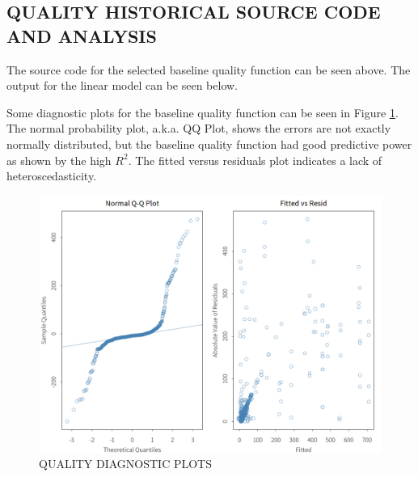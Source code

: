 \documentclass[SDSUThesis.tex]{subfiles}
\begin{document}
    \subsection{QUALITY HISTORICAL SOURCE CODE AND ANALYSIS}
    \label{app:quality-history}
        
        The source code for the selected baseline quality function
        can be seen above. The output for the linear model can be seen below.
        
        
        Some diagnostic plots for the baseline quality function
        can be seen in Figure \ref{fig:quality-diag}.  The normal probability plot,
        a.k.a. QQ Plot, shows the errors are not exactly normally distributed, but
        the baseline quality function had good predictive power as shown by the
        high $R^2$. The fitted versus
        residuals plot indicates a lack of heteroscedasticity.  
        \begin{figure}[ht]
            \centering
            \includegraphics[scale=.3]{images/quality_diag.png}
            \caption{QUALITY DIAGNOSTIC PLOTS}
            \label{fig:quality-diag}
        \end{figure}
        
\end{document}
